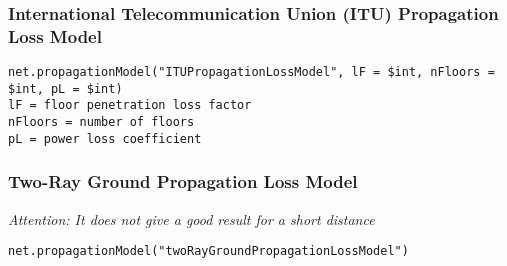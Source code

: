 \subsubsection{International Telecommunication Union (ITU) Propagation Loss Model}
\begin{verbatim}
net.propagationModel("ITUPropagationLossModel", lF = $int, nFloors = $int, pL = $int)  
lF = floor penetration loss factor
nFloors = number of floors
pL = power loss coefficient
\end{verbatim}

\subsubsection{Two-Ray Ground Propagation Loss Model}
\textit{Attention: It does not give a good result for a short distance}
\begin{verbatim}
net.propagationModel("twoRayGroundPropagationLossModel")	
\end{verbatim}